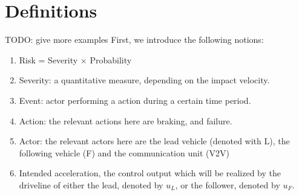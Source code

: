 \section{Definitions} %
\label{sec:definitions}

TODO: give more examples
First, we introduce the following notions:
\begin{enumerate}
\item{Risk = Severity $\times$ Probability  }
\item{Severity: a quantitative measure, depending on the impact velocity.}
\item{Event: actor performing a action during a certain time period.}
\item{Action: the relevant actions here are braking, and failure.  }
\item{Actor: the relevant actors here are the lead vehicle (denoted with L), the following vehicle (F) and the communication unit (V2V)}
\item{Intended acceleration,  the control output which will be realized by the driveline of either the lead, denoted by $u_L$, or the follower, denoted by $u_F$.}
\end{enumerate}
